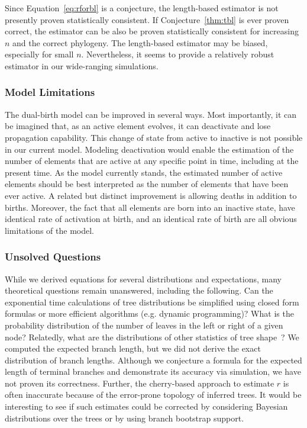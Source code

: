 Since Equation~\ref{eq:rforbl} is a conjecture, the length-based estimator is not presently proven statistically consistent. If Conjecture~\ref{thm:tbl} is ever proven correct, the estimator can be also be proven statistically consistent for increasing $n$ and the correct phylogeny. The length-based estimator may be biased, especially for small $n$. Nevertheless, it seems to provide a relatively robust estimator in our wide-ranging simulations.

\subsubsection{Model Limitations}
The dual-birth model can be improved in several ways. Most importantly, it can be imagined that, as an active element evolves, it can deactivate and lose propagation capability. This change of state from  active  to inactive is not possible in our current model. Modeling deactivation would enable the estimation of the number of elements that are active at any specific point in time, including at the present time. As the model currently stands, the estimated number of active elements should be best interpreted as the number of elements that have been ever active. A related but distinct improvement is allowing deaths in addition to births. Moreover, the fact that all elements are born into an inactive state, have identical rate of activation at birth, and an identical rate of birth are all obvious limitations of the model.

\subsubsection{Unsolved Questions}
While we derived equations for several distributions and expectations, many theoretical questions remain unanswered, including the following. Can the exponential time calculations of tree distributions be simplified using closed form formulas or more efficient algorithms (e.g. dynamic programming)? What is the probability distribution of the number of leaves in the left or right of a given node? Relatedly, what are the distributions of other statistics of tree shape~\cite{Matsen2006,Matsen2007}? We computed the expected branch length, but we did not derive the exact distribution of branch lengths. Although we conjecture a formula for the expected length of terminal branches and demonstrate its accuracy via simulation, we have not proven its correctness. Further, the cherry-based approach to estimate $r$ is often inaccurate because of the error-prone topology of inferred trees. It would be interesting to see if such estimates could be corrected by considering Bayesian distributions over the trees or by using branch bootstrap support.

